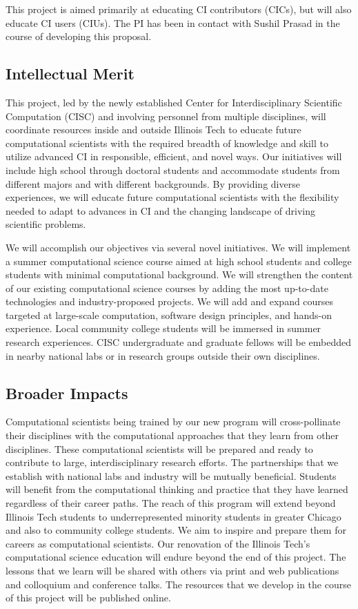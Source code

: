 \documentclass[11pt]{NSFamsart}
\begin{document}
This project is aimed primarily at educating CI contributors (CICs), but will also educate CI users (CIUs).  The PI has been in contact with Sushil Prasad in the course of developing this proposal.

\subsection*{Intellectual Merit}
This project, led by the newly established Center for Interdisciplinary Scientific Computation (CISC) and involving personnel from multiple disciplines, will coordinate resources inside and outside Illinois Tech to educate future computational scientists with the required breadth of knowledge and skill to utilize advanced CI in responsible, efficient, and novel ways. Our initiatives will include high school through doctoral students and accommodate students from different majors and with different backgrounds.  By providing diverse experiences, we will educate future computational scientists with the flexibility needed to adapt to advances in CI and the changing landscape of driving scientific problems. 

We will accomplish our objectives via several novel initiatives.  We will implement a summer computational science course aimed at high school students and college students with minimal computational background.  We will strengthen the content of our existing computational science courses by adding the most up-to-date technologies and industry-proposed projects.  We will add and expand courses targeted at large-scale computation, software design principles, and hands-on experience.  Local community college students will be immersed in summer research experiences.  CISC undergraduate and graduate fellows will be embedded in nearby national labs or in research groups outside their own disciplines.  

\subsection*{Broader Impacts}
Computational scientists being trained by our new program will cross-pollinate their disciplines with the computational approaches that they learn from other disciplines.  These computational scientists will be prepared and ready to contribute to large, interdisciplinary research efforts.  The partnerships that we establish with national labs and industry will be mutually beneficial.  Students will benefit from the  computational thinking and practice that they have learned regardless of their career paths. The reach of this program will extend beyond Illinois Tech students to underrepresented minority students in greater Chicago and also to community college students.  We aim to inspire and prepare them for careers as computational scientists. Our renovation of the Illinois Tech's computational science education will endure beyond the end of this project.  The lessons that we learn will be shared with others via print and web publications and colloquium and conference talks.  The resources that we develop in the course of this project will be  published online.
\end{document}
